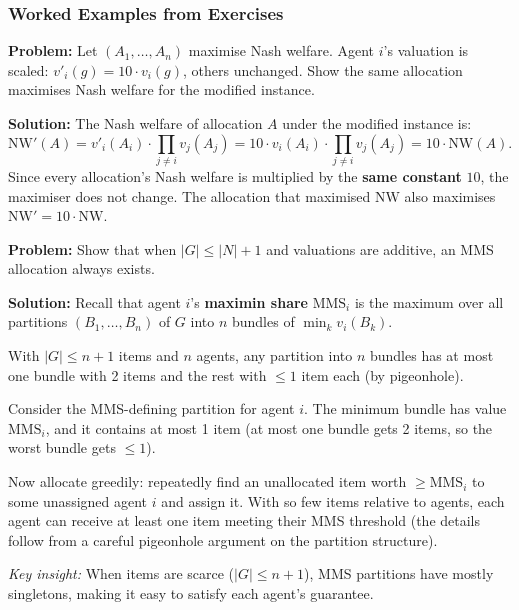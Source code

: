 \separator

\subsubsection{Worked Examples from Exercises}

\begin{exbox}
\textbf{Problem:} Let $(A_1, \ldots, A_n)$ maximise Nash welfare. Agent $i$'s valuation is scaled: $v'_i(g) = 10 \cdot v_i(g)$, others unchanged. Show the same allocation maximises Nash welfare for the modified instance.

\textbf{Solution:} The Nash welfare of allocation $A$ under the modified instance is:
\[
  \text{NW}'(A) = v'_i(A_i) \cdot \prod_{j \neq i} v_j(A_j) = 10 \cdot v_i(A_i) \cdot \prod_{j \neq i} v_j(A_j) = 10 \cdot \text{NW}(A).
\]
Since every allocation's Nash welfare is multiplied by the \textbf{same constant} $10$, the maximiser does not change. The allocation that maximised $\text{NW}$ also maximises $\text{NW}' = 10 \cdot \text{NW}$.
\end{exbox}

\begin{exbox}
\textbf{Problem:} Show that when $|G| \leq |N| + 1$ and valuations are additive, an MMS allocation always exists.

\textbf{Solution:} Recall that agent $i$'s \textbf{maximin share} $\text{MMS}_i$ is the maximum over all partitions $(B_1, \ldots, B_n)$ of $G$ into $n$ bundles of $\min_k v_i(B_k)$.

With $|G| \leq n + 1$ items and $n$ agents, any partition into $n$ bundles has at most one bundle with 2 items and the rest with $\leq 1$ item each (by pigeonhole).

Consider the MMS-defining partition for agent $i$. The minimum bundle has value $\text{MMS}_i$, and it contains at most 1 item (at most one bundle gets 2 items, so the worst bundle gets $\leq 1$).

Now allocate greedily: repeatedly find an unallocated item worth $\geq \text{MMS}_i$ to some unassigned agent $i$ and assign it. With so few items relative to agents, each agent can receive at least one item meeting their MMS threshold (the details follow from a careful pigeonhole argument on the partition structure).

\emph{Key insight:} When items are scarce ($|G| \leq n+1$), MMS partitions have mostly singletons, making it easy to satisfy each agent's guarantee.
\end{exbox}

